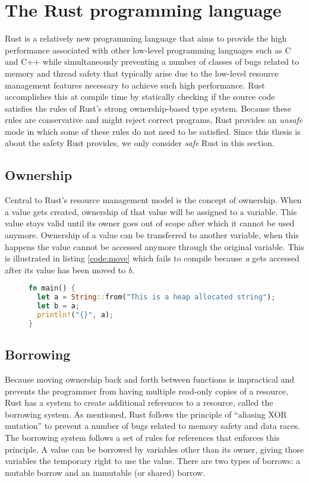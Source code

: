 \section{The Rust programming language}
\label{sec:rustbackground}
Rust is a relatively new programming language that aims to provide the high performance associated with other low-level programming languages such as C and C++ while simultaneously preventing a number of classes of bugs related to memory and thread safety that typically arise due to the low-level resource management features necessary to achieve such high performance.
Rust accomplishes this at compile time by statically checking if the source code satisfies the rules of Rust's strong ownership-based type system.
Because these rules are conservative and might reject correct programs, Rust provides an \textit{unsafe} mode in which some of these rules do not need to be satisfied.
Since this thesis is about the safety Rust provides, we only consider \textit{safe} Rust in this section.

\subsection{Ownership}
Central to Rust's resource management model is the concept of ownership.
When a value gets created, ownership of that value will be assigned to a variable.
This value stays valid until its owner goes out of scope after which it cannot be used anymore.
Ownership of a value can be transferred to another variable, when this happens the value cannot be accessed anymore through the original variable.
This is illustrated in listing \ref{code:move} which fails to compile because \textit{a} gets accessed after its value has been moved to \textit{b}.

\begin{figure}[h]
\begin{lstlisting}[language=Rust,frame=single,caption=Moving a variable,label=code:move]
fn main() {
  let a = String::from("This is a heap allocated string");
  let b = a;
  println!("{}", a);
}
\end{lstlisting}
\end{figure}

\subsection{Borrowing}
\label{subsec:borrowing}
Because moving ownership back and forth between functions is impractical and prevents the programmer from having multiple read-only copies of a resource, Rust has a system to create additional references to a resource, called the borrowing system.
As mentioned, Rust follows the principle of ``aliasing XOR mutation'' to prevent a number of bugs related to memory safety and data races.
The borrowing system follows a set of rules for references that enforces this principle.
A value can be borrowed by variables other than its owner, giving those variables the temporary right to use the value.
There are two types of borrows: a mutable borrow and an immutable (or shared) borrow. 

